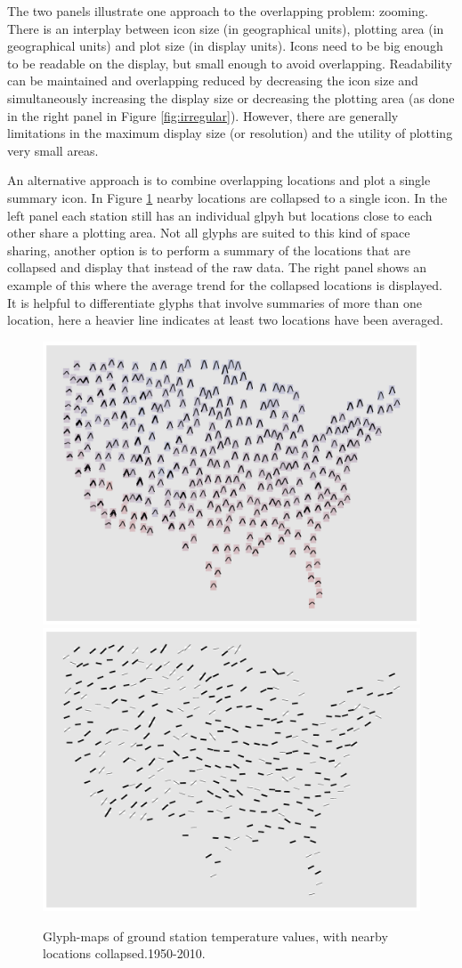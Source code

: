 \documentclass[oneside]{article}
\begin{document}
The two panels illustrate one approach to the overlapping problem: zooming.  There is an interplay between icon size (in geographical units), plotting area (in geographical units) and plot size (in display units).  Icons need to be big enough to be readable on the display, but small enough to avoid overlapping.  Readability can be maintained and overlapping reduced by decreasing the icon size and simultaneously increasing the display size or decreasing the plotting area (as done in the right panel in Figure \ref{fig:irregular}).  However, there are generally limitations in the maximum display size (or resolution) and the utility of plotting very small areas.  

An alternative approach is to combine overlapping locations and plot a single summary icon.  In Figure \ref{fig:irregular-collapsed} nearby locations are collapsed to a single icon.  In the left panel each station still has an individual glpyh but locations close to each other share a plotting area.  Not all glyphs are suited to this kind of space sharing, another option is to perform a summary of the locations that are collapsed and display that instead of the raw data.  The right panel shows an example of this where the average trend for the collapsed locations is displayed.  It is helpful to differentiate glyphs that involve summaries of more than one location, here a heavier line indicates at least two locations have been averaged.

\begin{figure}[htbp]
  \centering
  \includegraphics[width=0.5\linewidth]{usa-season-collapsed}%
  \includegraphics[width=0.5\linewidth]{usa-lin-collapse}%
  \caption{Glyph-maps of ground station temperature values, with nearby locations collapsed.1950-2010.}
  \label{fig:irregular-collapsed}
\end{figure}
\end{document}
